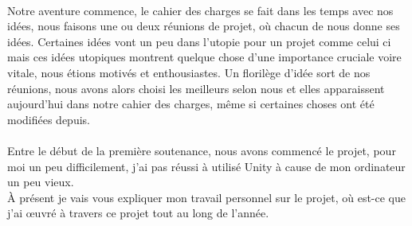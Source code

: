 \documentclass[titlepage, 13px, a4paper]{report}
\begin{document}
\paragraph{} \hspace{0pt}
Notre aventure commence, le cahier des charges se fait dans les temps avec nos idées, nous faisons une 
ou deux réunions de projet, où chacun de nous donne ses idées. Certaines idées vont un peu dans l'utopie 
pour un projet comme celui ci mais ces idées utopiques montrent quelque chose d'une importance cruciale 
voire vitale, nous étions motivés et enthousiastes. Un florilège d'idée sort de nos réunions, nous avons 
alors choisi les meilleurs selon nous et elles apparaissent aujourd'hui dans notre cahier des charges, 
même si certaines choses ont été modifiées depuis.  \\


\paragraph{} \hspace{0pt}
Entre le début de la première soutenance, nous avons commencé le projet, pour moi un peu difficilement, 
j'ai pas réussi à utilisé Unity à cause de mon ordinateur un peu vieux. \\
À présent je vais vous expliquer mon travail 
personnel sur le projet, où est-ce que j’ai œuvré à travers ce projet tout au long de l’année. \\
\end{document}
